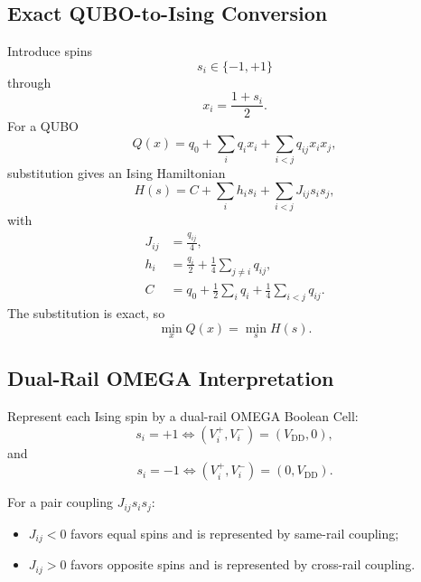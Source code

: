 \subsection{Exact QUBO-to-Ising Conversion}

Introduce spins
\begin{equation}
s_i\in\{-1,+1\}
\end{equation}
through
\begin{equation}
x_i=\frac{1+s_i}{2}.
\end{equation}
For a QUBO
\begin{equation}
Q(x)
=
q_0
+
\sum_i q_i x_i
+
\sum_{i<j}q_{ij}x_ix_j,
\end{equation}
substitution gives an Ising Hamiltonian
\begin{equation}
H(s)
=
C
+
\sum_i h_i s_i
+
\sum_{i<j}J_{ij}s_is_j,
\end{equation}
with
\begin{align}
J_{ij} &= \frac{q_{ij}}{4},\\
h_i &= \frac{q_i}{2}
+\frac14\sum_{j\neq i}q_{ij},\\
C &= q_0
+\frac12\sum_iq_i
+\frac14\sum_{i<j}q_{ij}.
\end{align}
The substitution is exact, so
\begin{equation}
\boxed{
\min_x Q(x)
=
\min_s H(s).
}
\end{equation}

\subsection{Dual-Rail OMEGA Interpretation}

Represent each Ising spin by a dual-rail OMEGA Boolean Cell:
\begin{equation}
s_i=+1
\iff
(V_i^+,V_i^-)=(V_{\mathrm{DD}},0),
\end{equation}
and
\begin{equation}
s_i=-1
\iff
(V_i^+,V_i^-)=(0,V_{\mathrm{DD}}).
\end{equation}

For a pair coupling $J_{ij}s_is_j$:

\begin{itemize}
    \item $J_{ij}<0$ favors equal spins and is represented by same-rail
    coupling;
    \item $J_{ij}>0$ favors opposite spins and is represented by cross-rail
    coupling.
\end{itemize}


